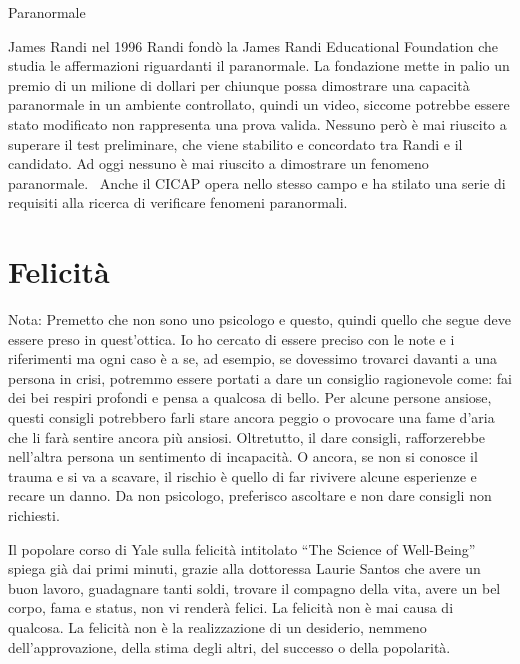 \documentclass[12pt]{book} %
\begin{document}
\begin{mdframed}[linewidth=1pt]
\bigskip

Paranormale

James Randi nel 1996 Randi fondò la James Randi Educational Foundation che studia le
affermazioni riguardanti il paranormale. La fondazione mette in palio un premio di un milione di dollari per chiunque
possa dimostrare una capacità paranormale in un ambiente controllato, quindi un video, siccome potrebbe essere stato
modificato non rappresenta una prova valida. Nessuno però è mai riuscito a superare il test preliminare, che viene
stabilito e concordato tra Randi e il candidato. Ad oggi nessuno è mai riuscito a dimostrare un fenomeno paranormale.
\ Anche il CICAP opera nello stesso campo e ha stilato una serie di
requisiti alla ricerca di verificare fenomeni paranormali.
\end{mdframed}

\bigskip


\bigskip

\clearpage\section{Felicità}
\begin{mdframed}[linewidth=1pt]
Nota: Premetto che non sono uno psicologo e questo, quindi quello che segue deve essere preso in
quest'ottica. Io ho cercato di essere preciso con le note e i riferimenti ma ogni caso è a se, ad
esempio, se dovessimo trovarci davanti a una persona in crisi, potremmo essere portati a dare un consiglio ragionevole
come: fai dei bei respiri profondi e pensa a qualcosa di bello. Per alcune persone ansiose, questi consigli potrebbero
farli stare ancora peggio o provocare una fame d'aria che li farà sentire ancora più ansiosi.
Oltretutto, il dare consigli, rafforzerebbe nell'altra persona un sentimento di incapacità. O
ancora, se non si conosce il trauma e si va a scavare, il rischio è quello di far rivivere alcune esperienze e recare
un danno. Da non psicologo, preferisco ascoltare e non dare consigli non richiesti.
\end{mdframed}

Il popolare corso di Yale sulla felicità intitolato “The Science of
Well-Being” spiega già dai primi minuti, grazie
alla dottoressa Laurie Santos che avere un buon lavoro, guadagnare tanti soldi, trovare il compagno della vita, avere
un bel corpo, fama e status, non vi renderà felici. La felicità non è mai causa di qualcosa. La felicità non è la
realizzazione di un desiderio, nemmeno dell'approvazione, della stima degli altri, del successo o
della popolarità.
\end{document}
